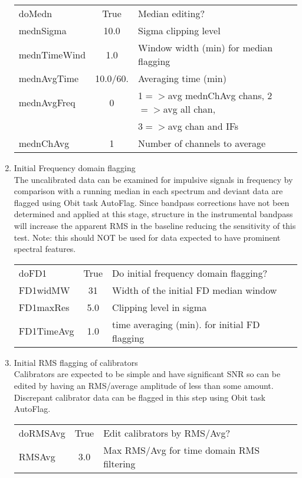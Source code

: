 \documentclass[11pt]{article}
\begin{document}
\begin{enumerate}
\begin{center}
\begin{tabular}{|l|c|l|}
\hline
doMedn       & True & Median editing? \\
mednSigma    & 10.0 &  Sigma clipping level\\
mednTimeWind & 1.0  &  Window width (min) for median flagging\\
mednAvgTime  & 10.0/60. & Averaging time (min) \\
mednAvgFreq  & 0    &  1$=>$avg mednChAvg chans, 2$=>$avg all chan,\\
 & & 3$=>$avg chan and IFs\\
mednChAvg    & 1    &  Number of channels to average\\
\hline
\end{tabular}
\end{center}
%
\item Initial Frequency domain flagging\\
The uncalibrated data can be examined for impulsive signals in
frequency by comparison with a running median in each spectrum and
deviant data are flagged using Obit task AutoFlag.
Since bandpass corrections have not been determined and applied at
this stage, structure in the instrumental bandpass will increase the
apparent RMS in the baseline reducing the sensitivity of this test.
Note: this should NOT be used for data expected to have prominent
spectral features.
\begin{center}
\begin{tabular}{|l|c|l|}
\hline
doFD1       & True &  Do initial frequency domain flagging?\\
FD1widMW    & 31   &  Width of the initial FD median window\\
FD1maxRes   & 5.0  &  Clipping level in sigma \\
FD1TimeAvg  & 1.0  &  time averaging (min). for initial FD flagging\\
\hline
\end{tabular}
\end{center}
%
\item Initial RMS flagging of calibrators \\
Calibrators are expected to be simple and have  significant SNR so can
be edited by having an RMS/average amplitude of less than some
amount.
Discrepant calibrator data can be flagged in this step using Obit task
AutoFlag.
\begin{center}
\begin{tabular}{|l|c|l|}
\hline
doRMSAvg   & True &  Edit calibrators by RMS/Avg?\\
RMSAvg     & 3.0  &  Max RMS/Avg for time domain RMS filtering\\

\end{tabular}
\end{center}
\end{enumerate}
\end{document}
